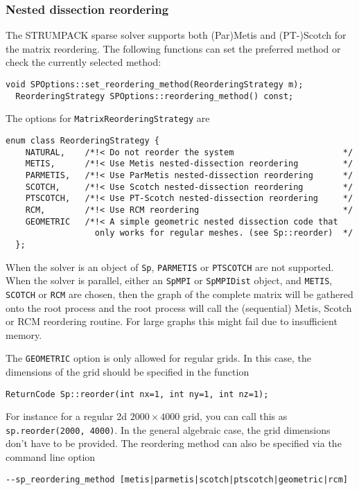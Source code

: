 \documentclass{article}
\begin{document}
\subsubsection{Nested dissection reordering}\label{sec:ND}
The STRUMPACK sparse solver supports both (Par)Metis and (PT-)Scotch
for the matrix reordering. The following functions can set the
preferred method or check the currently selected method:
\begin{lstlisting}[style=C]
  void SPOptions::set_reordering_method(ReorderingStrategy m);
  ReorderingStrategy SPOptions::reordering_method() const;
\end{lstlisting}
The options for
\lstinline[style=C]!MatrixReorderingStrategy! are
\begin{lstlisting}[style=C]
  enum class ReorderingStrategy {
    NATURAL,    /*!< Do not reorder the system                      */
    METIS,      /*!< Use Metis nested-dissection reordering         */
    PARMETIS,   /*!< Use ParMetis nested-dissection reordering      */
    SCOTCH,     /*!< Use Scotch nested-dissection reordering        */
    PTSCOTCH,   /*!< Use PT-Scotch nested-dissection reordering     */
    RCM,        /*!< Use RCM reordering                             */
    GEOMETRIC   /*!< A simple geometric nested dissection code that
                  only works for regular meshes. (see Sp::reorder)  */
  };
\end{lstlisting}
When the solver is an object of \lstinline[style=C]!Sp!,
\lstinline[style=C]!PARMETIS! or \lstinline[style=C]!PTSCOTCH! are not
supported.  When the solver is parallel, either an
\lstinline[style=C]!SpMPI! or \lstinline[style=C]!SpMPIDist! object,
and \lstinline[style=C]!METIS!, \lstinline[style=C]!SCOTCH! or
\lstinline[style=C]!RCM! are chosen, then the graph of the complete
matrix will be gathered onto the root process and the root process
will call the (sequential) Metis, Scotch or RCM reordering
routine. For large graphs this might fail due to insufficient memory.

The \lstinline[style=C]!GEOMETRIC! option is only allowed for regular
grids. In this case, the dimensions of the grid should be specified in
the function
\begin{lstlisting}[style=C]
  ReturnCode Sp::reorder(int nx=1, int ny=1, int nz=1);
\end{lstlisting}
For instance for a regular 2d $2000 \times 4000$ grid, you can call
this as \lstinline[style=C]!sp.reorder(2000, 4000)!. In the general
algebraic case, the grid dimensions don't have to be provided. The
reordering method can also be specified via the command line option
\begin{lstlisting}[style=Bash]
  --sp_reordering_method [metis|parmetis|scotch|ptscotch|geometric|rcm]
\end{lstlisting}
\end{document}
